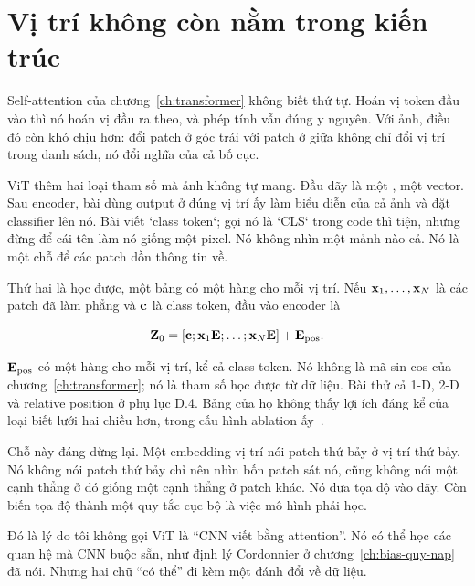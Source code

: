 \section{Vị trí không còn nằm trong kiến trúc}
\label{sec:ch11-vi-tri-khong-duoc-cho}

%
Self-attention của chương~\ref{ch:transformer} không biết thứ tự. Hoán vị token
đầu vào thì nó hoán vị đầu ra theo, và phép tính vẫn đúng y nguyên. Với ảnh,
điều đó còn khó chịu hơn: đổi patch ở góc trái với patch ở giữa không chỉ đổi
vị trí trong danh sách, nó đổi nghĩa của cả bố cục.

ViT thêm hai loại tham số mà ảnh không tự mang. Đầu dãy là một , một vector. Sau encoder, bài dùng output ở đúng vị trí ấy làm biểu diễn của cả ảnh
và đặt classifier lên nó. Bài viết `class token`; gọi nó là `CLS` trong code
thì tiện, nhưng đừng để cái tên làm nó giống một pixel. Nó không nhìn một mảnh
nào cả. Nó là một chỗ để các patch dồn thông tin về.

Thứ hai là  học được, một bảng có
một hàng cho mỗi vị trí. Nếu \(\mathbf{x}_1, \ldots, \mathbf{x}_N\) là các patch
đã làm phẳng và \(\mathbf{c}\) là class token, đầu vào encoder là

\begin{equation}
\label{eq:ch11-dau-vao-vit}
\mathbf{Z}_0 = [\mathbf{c}; \mathbf{x}_1\mathbf{E}; \ldots; \mathbf{x}_N\mathbf{E}]
  + \mathbf{E}_{\mathrm{pos}}.
\end{equation}

\(\mathbf{E}_{\mathrm{pos}}\) có một hàng cho mỗi vị trí, kể cả class token.
Nó không là mã sin-cos của chương~\ref{ch:transformer}; nó là tham số học được
từ dữ liệu. Bài thử cả 1-D, 2-D và relative position ở phụ lục D.4. Bảng của
họ không thấy lợi ích đáng kể của loại biết lưới hai chiều hơn, trong cấu hình
ablation ấy~\autocite{dosovitskiy2021vit}.

Chỗ này đáng dừng lại. Một embedding vị trí nói patch thứ bảy ở vị trí thứ bảy.
Nó không nói patch thứ bảy chỉ nên nhìn bốn patch sát nó, cũng không nói một
cạnh thẳng ở đó giống một cạnh thẳng ở patch khác. Nó đưa tọa độ vào dãy. Còn
biến tọa độ thành một quy tắc cục bộ là việc mô hình phải học.

Đó là lý do tôi không gọi ViT là \enquote{CNN viết bằng attention}. Nó có thể
học các quan hệ mà CNN buộc sẵn, như định lý Cordonnier ở
chương~\ref{ch:bias-quy-nap} đã nói. Nhưng hai chữ \enquote{có thể} đi kèm một
đánh đổi về dữ liệu.
